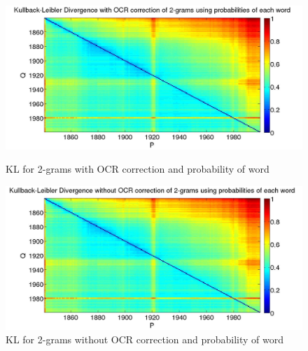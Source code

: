 \begin{figure}[H]
    \begin{minipage}[b]{0.48\linewidth}
        \includegraphics[scale=0.15]{Pictures/kullback-leibler/KL_2-grams_with_correction_proba.jpg}
        \caption{KL for 2-grams with OCR correction and probability of word}
        \label{KL-PC2}
    \end{minipage}\hfill
    \begin{minipage}[b]{0.5\linewidth}
        \includegraphics[scale=0.15]{Pictures/kullback-leibler/KL_2-grams_without_correction_proba.jpg}
        \caption{KL for 2-grams without OCR correction and probability of word}
        \label{KL-PN2}
    \end{minipage}\hfill
\end{figure}

